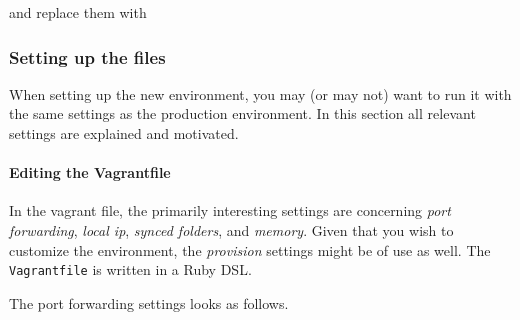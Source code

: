 \begin{Shaded}
\begin{Highlighting}[numbers=left,,]
 
 
\end{Highlighting}
\end{Shaded}

and replace them with

\begin{Shaded}
\begin{Highlighting}[numbers=left,,]
 
 \KeywordTok{<}\KeywordTok{>}
\end{Highlighting}
\end{Shaded}

\subsubsection{Setting up the files}\label{setting-up-the-files}

When setting up the new environment, you may (or may not) want to run it
with the same settings as the production environment. In this section
all relevant settings are explained and motivated.

\paragraph{Editing the Vagrantfile}\label{editing-the-vagrantfile}

In the vagrant file, the primarily interesting settings are concerning
\emph{port forwarding}, \emph{local ip}, \emph{synced folders}, and
\emph{memory}. Given that you wish to customize the environment, the
\emph{provision} settings might be of use as well. The
\texttt{Vagrantfile} is written in a Ruby DSL.

The port forwarding settings looks as follows.

\begin{Shaded}
\begin{Highlighting}[numbers=left,,]
\end{Highlighting}
\end{Shaded}

